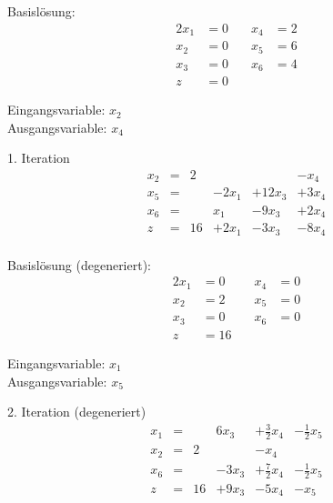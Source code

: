 \documentclass[a4paper]{scrartcl}
\begin{document}
\begin{enumerate}[label=\bfseries\arabic*.]
        Basislösung:
        \begin{alignat*}{2}
            x_1 &= 0 &\quad x_4 &= 2 \\
            x_2 &= 0 &\quad x_5 &= 6 \\
            x_3 &= 0 &\quad x_6 &= 4 \\
            z &= 0
        \end{alignat*}

        Eingangsvariable: $x_2$ \\
        Ausgangsvariable: $x_4$

        1. Iteration
        \begin{equation}
            \begin{array}{rcrrrr}
                x_2 & = & 2 &  &  & -x_4 \\
                x_5 & = &   & -2x_1 & + 12x_3 & +3x_4 \\
                x_6 & = &   & x_1 & -9x_3 & +2x_4 \\
                \hline
                z   & = & 16 & + 2x_1 & -3x_3 & -8x_4 \\
            \end{array}
        \end{equation}

        Basislösung (degeneriert):
        \begin{alignat*}{2}
            x_1 &= 0 &\quad x_4 &= 0 \\
            x_2 &= 2 &\quad x_5 &= 0 \\
            x_3 &= 0 &\quad x_6 &= 0 \\
            z &= 16
        \end{alignat*}

        Eingangsvariable: $x_1$ \\
        Ausgangsvariable: $x_5$

        2. Iteration (degeneriert)
        \begin{equation}
            \begin{array}{rcrrrr}
                x_1 & = &   & 6x_3 & +\frac{3}{2}x_4 & -\frac{1}{2}x_5 \\
                x_2 & = & 2 &  & -x_4 & \\
                x_6 & = &   & -3x_3 & +\frac{7}{2}x_4 & -\frac{1}{2}x_5 \\
                \hline
                z   & = & 16 & +9x_3 & -5x_4 & -x_5\\
            \end{array}
        \end{equation}


\end{enumerate}
\end{document}
